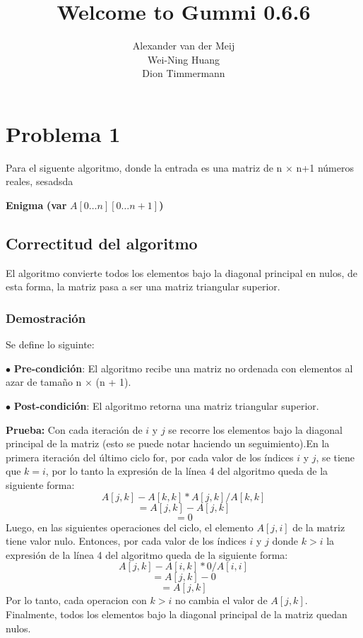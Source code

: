 \documentclass[11pt]{article}
\title{\textbf{Welcome to Gummi 0.6.6}}
\author{Alexander van der Meij\\
		Wei-Ning Huang\\
		Dion Timmermann}
\date{}
\begin{document}
\maketitle
\section{Problema 1}
Para el siguente algoritmo, donde la entrada es una matriz de n $\times$ n+1 números reales, sesadsda

\begin{algorithm}[H]
\caption{\textbf{Enigma }\textbf{(var} $A[0 \dots n][0 \dots n + 1]$\textbf{)}}
\end{algorithm}
\subsection{Correctitud del algoritmo}
El algoritmo convierte todos los elementos bajo la diagonal principal en nulos, de esta forma, la matriz pasa a ser una matriz triangular superior.
\subsubsection{Demostración}
Se define lo siguinte:

$\bullet$ \textbf{Pre-condición}: El algoritmo recibe una matriz no ordenada con elementos al azar de tamaño  n $\times$ (n + 1).

$\bullet$ \textbf{Post-condición}: El algoritmo retorna una matriz triangular superior.

\textbf{Prueba:} 
Con cada iteración de \(i\) y \(j\) se recorre los elementos bajo la diagonal principal de la matriz (esto se puede notar haciendo un seguimiento).En la primera iteración del último ciclo for, por cada valor de los índices \(i\) y \(j\), se tiene que \(k = i\), por lo tanto la expresión de la línea 4 del algoritmo queda de la siguiente forma:
\[A[j,k] - A[k,k] \ast  A[j,k] / A[k,k] \]
\[=A[j,k] - A[j,k]  \]
\[ = 0  \]
Luego, en las siguientes operaciones del ciclo, el elemento \( A[j,i]  \) de la matriz tiene valor nulo. Entonces, por cada valor de los índices \(i\) y \(j\) donde \( k > i  \) la expresión de la línea 4 del algoritmo queda de la siguiente forma:
\[A[j,k] - A[i,k] \ast  0 / A[i,i] \]
\[= A[j,k] - 0 \]
\[= A[j,k] \]
Por lo tanto, cada operacion con \( k > i  \) no cambia el valor de \(A[j,k]\). Finalmente, todos los elementos bajo la diagonal principal de la matriz quedan nulos.
\end{document}
